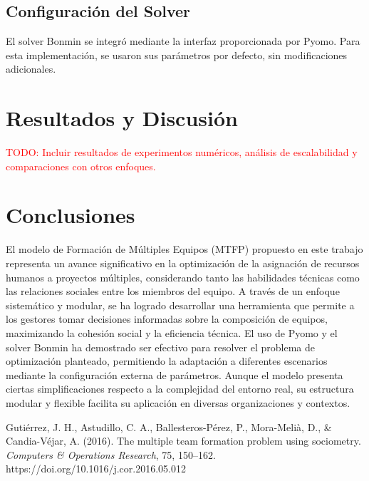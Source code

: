 \documentclass[conference]{IEEEtran}
\begin{document}
\subsection{Configuración del Solver}

El solver Bonmin se integró mediante la interfaz proporcionada por Pyomo. Para esta implementación, se usaron sus parámetros por defecto, sin modificaciones adicionales.


\section{Resultados y Discusión}

\textcolor{red}{TODO: Incluir resultados de experimentos numéricos, análisis de escalabilidad y comparaciones con otros enfoques.}

\section{Conclusiones}
El modelo de Formación de Múltiples Equipos (MTFP) propuesto en este trabajo representa un avance significativo en la optimización de la asignación de recursos humanos a proyectos múltiples, considerando tanto las habilidades técnicas como las relaciones sociales entre los miembros del equipo. A través de un enfoque sistemático y modular, se ha logrado desarrollar una herramienta que permite a los gestores tomar decisiones informadas sobre la composición de equipos, maximizando la cohesión social y la eficiencia técnica.
El uso de Pyomo y el solver Bonmin ha demostrado ser efectivo para resolver el problema de optimización planteado, permitiendo la adaptación a diferentes escenarios mediante la configuración externa de parámetros. Aunque el modelo presenta ciertas simplificaciones respecto a la complejidad del entorno real, su estructura modular y flexible facilita su aplicación en diversas organizaciones y contextos.


\begin{thebibliography}{00}

    Gutiérrez, J. H., Astudillo, C. A., Ballesteros-Pérez, P., Mora-Melià, D., \& Candia-Véjar, A. (2016).
    The multiple team formation problem using sociometry.
    \textit{Computers \& Operations Research}, 75, 150--162. https://doi.org/10.1016/j.cor.2016.05.012

\end{thebibliography}
\end{document}
